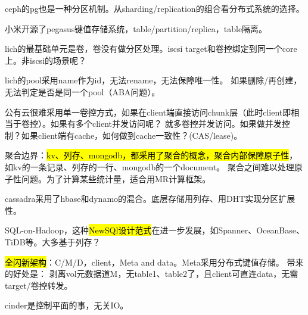 ceph的pg也是一种分区机制。从sharding/replication的组合看分布式系统的选择。

小米开源了pegasus键值存储系统，table/partition/replica，table隔离。

lich的最基础单元是卷，卷没有做分区处理。iscsi target和卷控绑定到同一个core上。非iscsi的场景呢？

lich的pool采用name作为id，无法rename，无法保障唯一性。
如果删除/再创建，无法判定是否是同一个pool（ABA问题）。

公有云很难采用单一卷控方式，如果在client端直接访问chunk层（此时client即相当于卷控）。如果有多个client并发访问呢？
就多卷控并发访问。如果做并发控制？如果client端有cache，如何做到cache一致性？(CAS/lease)。

聚合边界：\hl{kv、列存、mongodb，都采用了聚合的概念，聚合内部保障原子性}，如kv的一条记录、列存的一行、mongodb的一个document。
聚合之间难以处理原子性问题。为了计算某些统计量，适合用MR计算框架。

cassadra采用了hbase和dynamo的混合。底层存储用列存、用DHT实现分区扩展性。

SQL-on-Hadoop，这种\hl{NewSQl设计范式}在进一步发展，如Spanner、OceanBase、TiDB等。大多基于列存？

\hl{全闪新架构}：C/M/D，client，Meta and data。Meta采用分布式键值存储。
带来的好处是： 剥离vol元数据道M，无table1、table2了，且client可直连data，无需target/卷控转发。

cinder是控制平面的事，无关IO。

